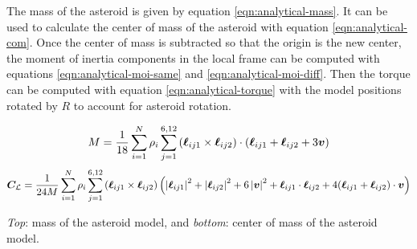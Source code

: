 \documentclass[aps,twocolumn,secnumarabic,balancelastpage,amsmath,amssymb,nofootinbib,floatfix]{revtex4-1}
\begin{document}
The mass of the asteroid is given by equation \ref{eqn:analytical-mass}. It can be used to calculate the center of mass of the asteroid with equation \ref{eqn:analytical-com}. Once the center of mass is subtracted so that the origin is the new center, the moment of inertia components in the local frame can be computed with equations \ref{eqn:analytical-moi-same} and  \ref{eqn:analytical-moi-diff}. Then the torque can be computed with equation \ref{eqn:analytical-torque} with the model positions rotated by $R$ to account for asteroid rotation.

\begin{table*}
    \begin{equation}
        M = \frac{1}{18}\sum_{i=1}^N\rho_i \sum_{j=1}^{6, 12} \left( \bm\ell_{ij1} \times \bm\ell_{ij2} \right) \cdot (\bm \ell_{ij1} + \bm \ell_{ij2} + 3\bm v)
        \label{eqn:analytical-mass}
    \end{equation}
    \begin{equation}
        \bm C_\mathcal{L} = \frac{1}{24M}\sum_{i=1}^N\rho_i \sum_{j=1}^{6, 12} \left( \bm\ell_{ij1} \times \bm\ell_{ij2} \right) \left( \left| \bm\ell_{ij1} \right|^2  + \left| \bm\ell_{ij2} \right|^2 + 6\left| \bm v \right|^2 + \bm\ell_{ij1} \cdot \bm\ell_{ij2} + 4(\bm \ell_{ij1} + \bm \ell_{ij2})\cdot \bm v \right)
        \label{eqn:analytical-com}
    \end{equation}
    \caption*{\textit{Top}: mass of the asteroid model, and \textit{bottom}: center of mass of the asteroid model. }
\end{table*}
\end{document}
